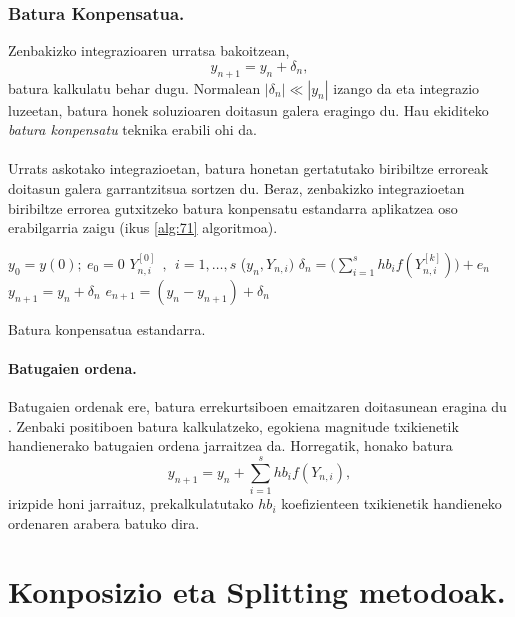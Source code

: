 \subsubsection*{Batura Konpensatua.}

Zenbakizko integrazioaren urratsa bakoitzean,
\begin{equation*}
y_{n+1}=y_{n}+ \delta_n,
\end{equation*}
batura kalkulatu behar dugu. Normalean $|\delta_n|\ll |y_n| $ izango da eta integrazio luzeetan, batura honek soluzioaren doitasun galera eragingo du. Hau ekiditeko \emph{batura konpensatu} teknika erabili ohi da.

\paragraph*{}Urrats askotako integrazioetan, batura honetan gertatutako biribiltze erroreak doitasun galera garrantzitsua sortzen du. Beraz, zenbakizko integrazioetan biribiltze errorea gutxitzeko  batura konpensatu estandarra aplikatzea oso erabilgarria zaigu (ikus \ref{alg:71} algoritmoa).

\begin{algorithm}[h]
 \BlankLine
  $y_0=y(0); \ {e}_{0}=0$\;
  \BlankLine
  {
     $Y_{n,i}^{[0]} \ \ , \ \ i=1,\dots,s $\;
    ($y_n, Y_{n,i})$ \;
   \BlankLine
    ${\delta}_{n}= \big(\sum\limits_{i=1}^{s} hb_i f(Y_{n,i}^{[k]})\big) +  {e}_{n} $\;
    ${y}_{n+1}={y}_{n} + {\delta}_n$\;
    ${e}_{n+1}=({y}_{n} - {y}_{n+1})+ {\delta}_n$\;            
   \BlankLine
 }
 \caption{Batura konpensatua estandarra.}
 \label{alg:71}
\end{algorithm}

\paragraph*{Batugaien ordena.}
Batugaien ordenak ere, batura errekurtsiboen emaitzaren doitasunean eragina du \cite{Higham2002}. Zenbaki positiboen batura kalkulatzeko, egokiena magnitude txikienetik handienerako batugaien ordena jarraitzea da. Horregatik, honako batura
\begin{equation*}
y_{n+1}=y_n+\sum\limits_{i=1}^{s} hb_i f(Y_{n,i}),
\end{equation*}
irizpide honi jarraituz, prekalkulatutako $hb_i$ koefizienteen txikienetik handieneko ordenaren arabera batuko dira. 
 

\section{Konposizio eta Splitting metodoak.}

